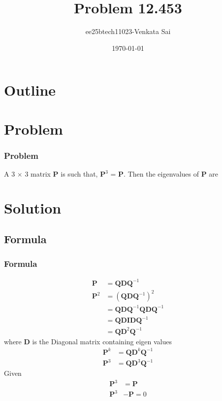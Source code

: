 \documentclass{beamer}
\title{Problem 12.453}
\author{ee25btech11023-Venkata Sai}
\date{\today}
\providecommand{\brak}[1]{\ensuremath{\left(#1\right)}}
\theoremstyle{remark}
\let\vec\mathbf
\numberwithin{equation}{section}
\begin{document}
\begin{frame}
\titlepage
\end{frame}

\section*{Outline}
\begin{frame}
\tableofcontents
\end{frame}

\section{Problem}

\begin{frame}
\frametitle{Problem}
A 3 $\times$ 3 matrix $\vec{P}$ is such that, $\vec{P}^3$ = $\vec{P}$. Then the eigenvalues of $\vec{P}$ are\\
\end{frame}
\section{Solution}

 
\subsection{Formula}
\begin{frame}
\frametitle{Formula}
  \begin{align}
     \vec{P}&=\vec{Q}\vec{D}\vec{Q}^{-1} \\
      \vec{P}^2&=\brak{\vec{Q}\vec{D}\vec{Q}^{-1}}^2 \\
      &=\vec{Q}\vec{D}\vec{Q}^{-1}\vec{Q}\vec{D}\vec{Q}^{-1}\\
      &=\vec{Q}\vec{D}\vec{I}\vec{D}\vec{Q}^{-1}\\
      &=\vec{Q}\vec{D}^2\vec{Q}^{-1}
 \end{align}
 where $\vec{D}$ is the Diagonal matrix containing eigen values
 \begin{align}
     \vec{P}^k&=\vec{Q}\vec{D}^k\vec{Q}^{-1} \\
     \vec{P}^3&=\vec{Q}\vec{D}^3\vec{Q}^{-1} 
     \end{align}
Given 
\begin{align}
    \vec{P}^3 &= \vec{P} \\
      \vec{P}^{3}& - \vec{P} = 0
      \end{align}

\end{frame}
\end{document}
